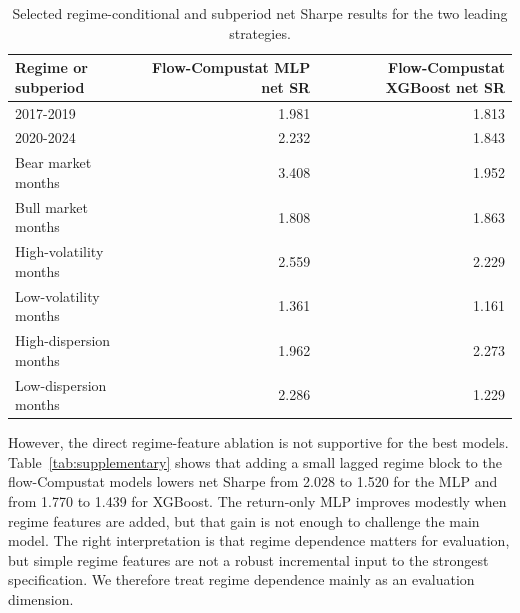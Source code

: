 \begin{table}[t]
\centering
\scriptsize
\setlength{\tabcolsep}{4.5pt}
\begin{tabular*}{\textwidth}{@{\extracolsep{\fill}} lrr@{}}
\toprule
Regime or subperiod & Flow-Compustat MLP net SR & Flow-Compustat XGBoost net SR \\
\midrule
2017-2019 & 1.981 & 1.813 \\
2020-2024 & 2.232 & 1.843 \\
Bear market months & 3.408 & 1.952 \\
Bull market months & 1.808 & 1.863 \\
High-volatility months & 2.559 & 2.229 \\
Low-volatility months & 1.361 & 1.161 \\
High-dispersion months & 1.962 & 2.273 \\
Low-dispersion months & 2.286 & 1.229 \\
\bottomrule
\end{tabular*}
\caption{Selected regime-conditional and subperiod net Sharpe results for the
two leading strategies.
}
\label{tab:regime-summary}
\end{table}

However, the direct regime-feature ablation is not supportive for the best
models. Table~\ref{tab:supplementary} shows that adding a small lagged regime
block to the flow-Compustat models lowers net Sharpe from 2.028 to 1.520 for
the MLP and from 1.770 to 1.439 for XGBoost. The return-only MLP improves
modestly when regime features are added, but that gain is not enough to
challenge the main model. The right interpretation is that regime
dependence matters for evaluation, but simple regime features are not a robust
incremental input to the strongest specification. We therefore treat regime
dependence mainly as an evaluation dimension.

